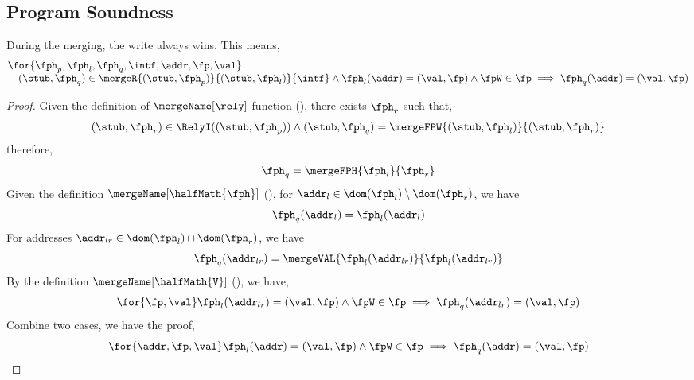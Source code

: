 \subsection{Program Soundness}


\begin{lem}
\label{lem:write-win-merge}
During the merging, the write always wins.
This means,
\[
\begin{array}{@{}l@{}}
    \for{\fph_{p}, \fph_{l}, \fph_{q}, \intf, \addr, \fp, \val} \\
    \quad (\stub, \fph_{q}) \in \mergeR{(\stub, \fph_{p})}{(\stub, \fph_{l})}{\intf}
    \land \fph_{l}(\addr) = (\val, \fp) 
    \land \fpW \in \fp
    \implies \fph_{q}(\addr) = (\val, \fp)
\end{array}
\]
\end{lem}
\begin{proof}
Given the definition of \( \mergeName[\rely] \) function (), there exists \(  \fph_{r} \) such that,
\[
    (\stub, \fph_{r}) \in \RelyI((\stub, \fph_{p})) \land (\stub, \fph_{q}) = \mergeFPW{(\stub,\fph_{l})}{(\stub,\fph_{r})}
\]
therefore, 
\[
    \fph_{q} = \mergeFPH{\fph_{l}}{\fph_{r}}
\]
Given the definition \( \mergeName[\halfMath{\fph}] \) (), for \( \addr_{l} \in \dom(\fph_{l}) \setminus \dom(\fph_{r})  \), we have 
\[
\fph_{q}(\addr_{l}) = \fph_{l}(\addr_{l})
\]
For addresses \( \addr_{lr} \in \dom(\fph_{l}) \cap \dom(\fph_{r})\), we have 
\[
\fph_{q}(\addr_{lr}) = \mergeVAL{\fph_{l}(\addr_{lr})}{\fph_{l}(\addr_{lr})}
\]
By the definition \( \mergeName[\halfMath{\mathtt{V}}] \) (), we have,
\[
    \for{\fp, \val} \fph_{l}(\addr_{lr}) = (\val, \fp) 
    \land \fpW \in \fp
    \implies \fph_{q}(\addr_{lr}) = (\val, \fp)
\]
Combine two cases, we have the proof, \ie
\[
    \for{ \addr,\fp, \val}
     \fph_{l}(\addr) = (\val, \fp) 
    \land \fpW \in \fp
    \implies \fph_{q}(\addr) = (\val, \fp)
\]
\end{proof}


